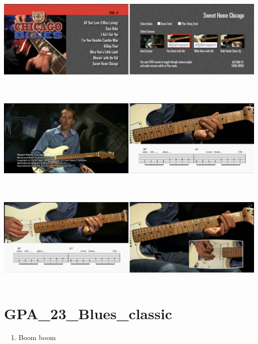 \documentclass[a4paper]{book}
\begin{document}
\clearpage

\begin{center}
\includegraphics[width=17cm,height=4.78cm]{lebluessupportsmethodes-img64.jpg}
\end{center}





\begin{center}
\includegraphics[width=17cm,height=4.78cm]{lebluessupportsmethodes-img65.jpg}
\end{center}


\begin{center}
\includegraphics[width=17cm,height=4.78cm]{lebluessupportsmethodes-img66.jpg}
\end{center}






\clearpage\section[GPA\_23\_Blues\_classic]{GPA\_23\_Blues\_classic}
\hypertarget{RefHeadingToc136973218262}{}\ \  1. Boom boom
\end{document}
